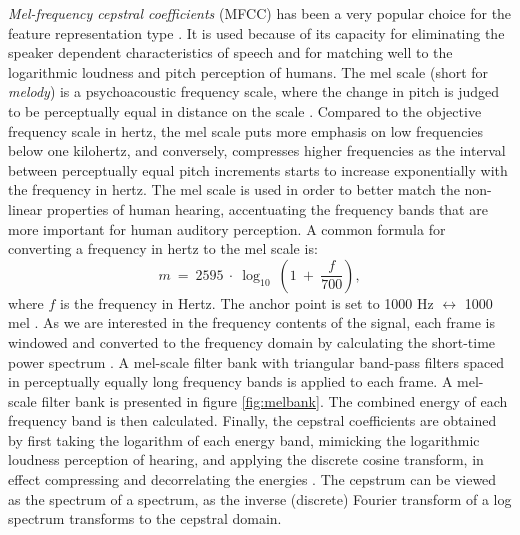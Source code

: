\documentclass[english, 12pt, a4paper, pdftex, elec, utf8]{aaltothesis}
\begin{document}
\textit{Mel-frequency cepstral coefficients} (MFCC) has been a very popular choice for the feature representation type \cite{yu2014automatic, gales2008application, kallasjoki2016}. It is used because of its capacity for eliminating the speaker dependent characteristics of speech and for matching well to the logarithmic loudness and pitch perception of humans. The mel scale (short for \textit{melody}) is a psychoacoustic frequency scale, where the change in pitch is judged to be perceptually equal in distance on the scale \cite[p.~174]{pulkki2015communication}. Compared to the objective frequency scale in hertz, the mel scale puts more emphasis on low frequencies below one kilohertz, and conversely, compresses higher frequencies as the interval between perceptually equal pitch increments starts to increase exponentially with the frequency in hertz. The mel scale is used in order to better match the non-linear properties of human hearing, accentuating the frequency bands that are more important for human auditory perception. A common formula for converting a frequency in hertz to the mel scale is:
\begin{equation} \label{eq:mel}
m \ = \ 2595 \  \cdot \ \log_{10} \ \left(1 \ + \ \frac{f}{700} \right),
\end{equation} where $f$ is the frequency in Hertz. The anchor point is set to 1000 Hz $\leftrightarrow$ 1000 mel \cite[p.~174--175]{pulkki2015communication}. As we are interested in the frequency contents of the signal, each frame is windowed and converted to the frequency domain by calculating the short-time power spectrum \cite{gales2008application}. A mel-scale filter bank with triangular band-pass filters spaced in perceptually equally long frequency bands is applied to each frame. A mel-scale filter bank is presented in figure \ref{fig:melbank}. The combined energy of each frequency band is then calculated. Finally, the cepstral coefficients are obtained by first taking the logarithm of each energy band, mimicking the logarithmic loudness perception of hearing, and applying the discrete cosine transform, in effect compressing and decorrelating the energies \cite{huang2001spoken, gales2008application}. The cepstrum can be viewed as the spectrum of a spectrum, as the inverse (discrete) Fourier transform of a log spectrum transforms to the cepstral domain.
\end{document}
